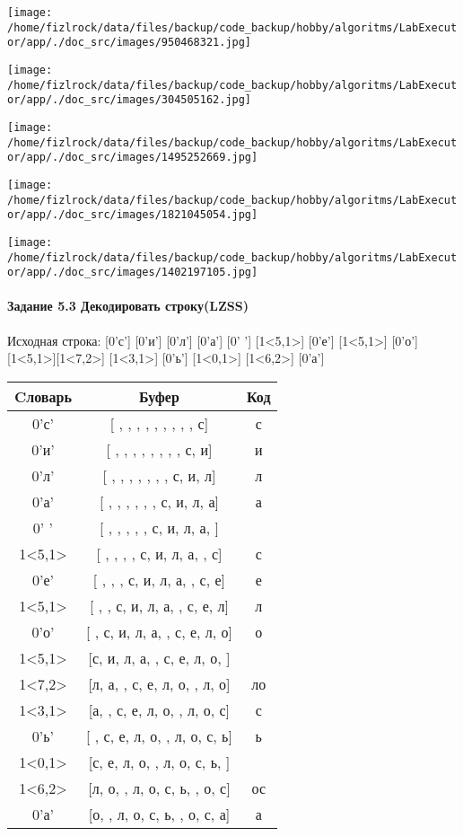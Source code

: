 \documentclass[a4paper, 12pt]{article}
\begin{document}
\texttt{[image: /home/fizlrock/data/files/backup/code\_backup/hobby/algoritms/LabExecutor/app/./doc\_src/images/950468321.jpg]}

\texttt{[image: /home/fizlrock/data/files/backup/code\_backup/hobby/algoritms/LabExecutor/app/./doc\_src/images/304505162.jpg]}

\texttt{[image: /home/fizlrock/data/files/backup/code\_backup/hobby/algoritms/LabExecutor/app/./doc\_src/images/1495252669.jpg]}

\texttt{[image: /home/fizlrock/data/files/backup/code\_backup/hobby/algoritms/LabExecutor/app/./doc\_src/images/1821045054.jpg]}

\texttt{[image: /home/fizlrock/data/files/backup/code\_backup/hobby/algoritms/LabExecutor/app/./doc\_src/images/1402197105.jpg]}
\pagebreak
\paragraph{Задание 5.3 Декодировать строку(LZSS)\\}

Исходная строка: [0'с'] [0'и'] [0'л'] [0'а'] [0' '] [1<5,1>] [0'е'] [1<5,1>] [0'о'] [1<5,1>][1<7,2>] [1<3,1>] [0'ь'] [1<0,1>] [1<6,2>] [0'а']\\
\begin{table}[h!]
\centering
\begin{tabular}{|c|c|c|}
\hline
 Cловарь & Буфер & Код  \\ \hline
0'с' & [ ,  ,  ,  ,  ,  ,  ,  ,  , с] & с
\\ \hline
0'и' & [ ,  ,  ,  ,  ,  ,  ,  , с, и] & и
\\ \hline
0'л' & [ ,  ,  ,  ,  ,  ,  , с, и, л] & л
\\ \hline
0'а' & [ ,  ,  ,  ,  ,  , с, и, л, а] & а
\\ \hline
0' ' & [ ,  ,  ,  ,  , с, и, л, а,  ] &  
\\ \hline
1<5,1> & [ ,  ,  ,  , с, и, л, а,  , с] & с
\\ \hline
0'е' & [ ,  ,  , с, и, л, а,  , с, е] & е
\\ \hline
1<5,1> & [ ,  , с, и, л, а,  , с, е, л] & л
\\ \hline
0'о' & [ , с, и, л, а,  , с, е, л, о] & о
\\ \hline
1<5,1> & [с, и, л, а,  , с, е, л, о,  ] &  
\\ \hline
1<7,2> & [л, а,  , с, е, л, о,  , л, о] & ло
\\ \hline
1<3,1> & [а,  , с, е, л, о,  , л, о, с] & с
\\ \hline
0'ь' & [ , с, е, л, о,  , л, о, с, ь] & ь
\\ \hline
1<0,1> & [с, е, л, о,  , л, о, с, ь,  ] &  
\\ \hline
1<6,2> & [л, о,  , л, о, с, ь,  , о, с] & ос
\\ \hline
0'а' & [о,  , л, о, с, ь,  , о, с, а] & а
\\ \hline
\end{tabular}
\end{table}
\end{document}
